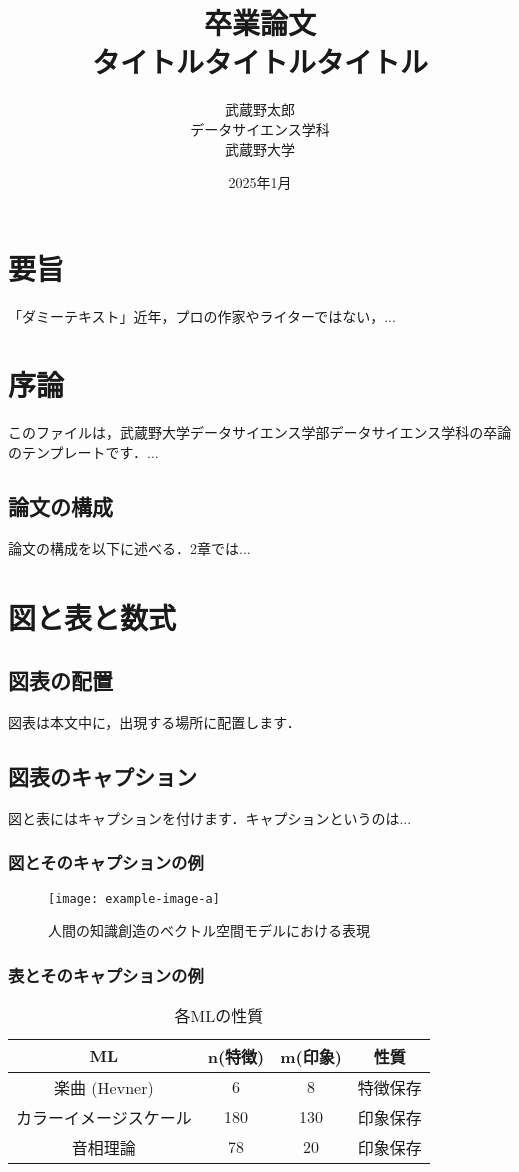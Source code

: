 \documentclass[a4paper,12pt]{report}
\title{卒業論文\\ タイトルタイトルタイトル}
\author{武蔵野太郎\\ データサイエンス学科\\ 武蔵野大学}
\date{2025年1月}
\begin{document}
\maketitle

\chapter*{要旨}
「ダミーテキスト」近年，プロの作家やライターではない，...

\tableofcontents

\chapter{序論}
このファイルは，武蔵野大学データサイエンス学部データサイエンス学科の卒論のテンプレートです．...

\section{論文の構成}
論文の構成を以下に述べる．2章では...

\chapter{図と表と数式}
\section{図表の配置}
図表は本文中に，出現する場所に配置します．

\section{図表のキャプション}
図と表にはキャプションを付けます．キャプションというのは...

\subsection{図とそのキャプションの例}
\begin{figure}[htbp]
    \centering
    \texttt{[image: example-image-a]}
    \caption{人間の知識創造のベクトル空間モデルにおける表現}
\end{figure}

\subsection{表とそのキャプションの例}
\begin{table}[htbp]
    \centering
    \begin{tabular}{|c|c|c|c|}
        \hline
        ML & n(特徴) & m(印象) & 性質 \\ \hline
        楽曲 (Hevner) & 6 & 8 & 特徴保存 \\ \hline
        カラーイメージスケール & 180 & 130 & 印象保存 \\ \hline
        音相理論 & 78 & 20 & 印象保存 \\ \hline
    \end{tabular}
    \caption{各MLの性質}
\end{table}
\end{document}
